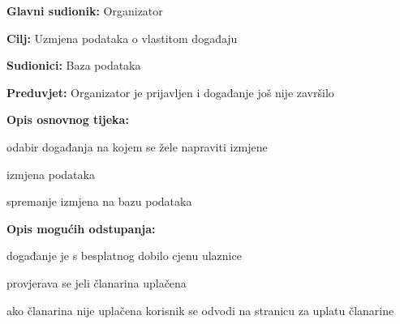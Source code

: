 					\noindent {}
					\begin{packed_item}
	
						\item \textbf{Glavni sudionik: }Organizator
						\item  \textbf{Cilj:} Uzmjena podataka o vlastitom događaju
						\item  \textbf{Sudionici:} Baza podataka
						\item  \textbf{Preduvjet:} Organizator je prijavljen i događanje još nije završilo
						\item  \textbf{Opis osnovnog tijeka:}
						
						\item[] \begin{packed_enum}
	
							\item odabir događanja na kojem se žele napraviti izmjene
							\item izmjena podataka
							\item spremanje izmjena na bazu podataka
							
						\end{packed_enum}
						
						\item  \textbf{Opis mogućih odstupanja:}
						
						\item[] \begin{packed_item}
	
							\item[2.a] događanje je s besplatnog dobilo cjenu ulaznice
							\item[] \begin{packed_enum}
								
								\item provjerava se jeli članarina uplačena
								\item ako članarina nije uplačena korisnik se odvodi na stranicu za uplatu članarine
								
							\end{packed_enum}
						\end{packed_item}
							
					\end{packed_item}
					
